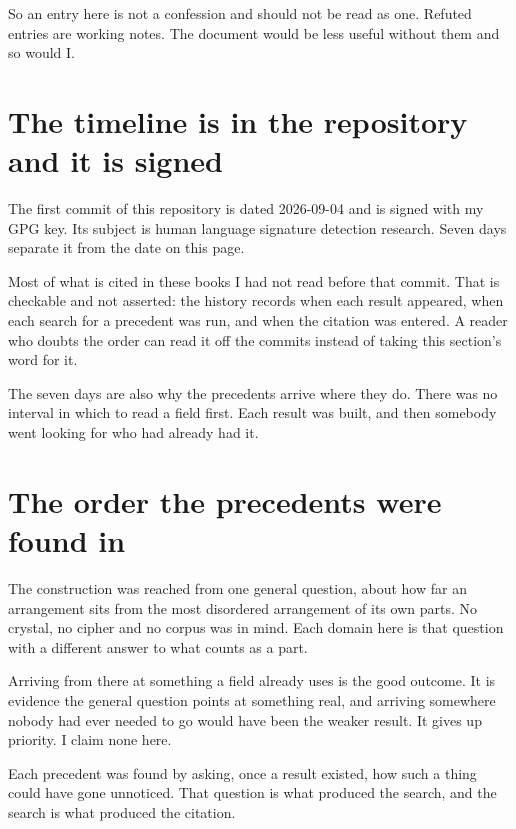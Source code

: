 So an entry here is not a confession and should not be read as one. Refuted entries are
working notes. The document would be less useful without them and so would I.

\section*{The timeline is in the repository and it is signed}

The first commit of this repository is dated 2026-09-04 and is signed with my GPG key. Its subject is
human language signature detection research. Seven days separate it from the date on this page.

Most of what is cited in these books I had not read before that commit. That is checkable and not
asserted: the history records when each result appeared, when each search for a precedent was
run, and when the citation was entered. A reader who doubts the order can read it off the commits
instead of taking this section's word for it.

The seven days are also why the precedents arrive where they do. There was no interval in which to
read a field first. Each result was built, and then somebody went looking for who had already had
it.

\section*{The order the precedents were found in}

The construction was reached from one general question, about how far an arrangement sits from the
most disordered arrangement of its own parts. No crystal, no cipher and no corpus was in mind. Each
domain here is that question with a different answer to what counts as a part.

Arriving from there at something a field already uses is the good outcome. It is evidence the
general question points at something real, and arriving somewhere nobody had ever needed to go would
have been the weaker result. It gives up priority. I claim none here.

Each precedent was found by asking, once a result existed, how such a thing could have gone
unnoticed. That question is what produced the search, and the search is what produced the citation.

